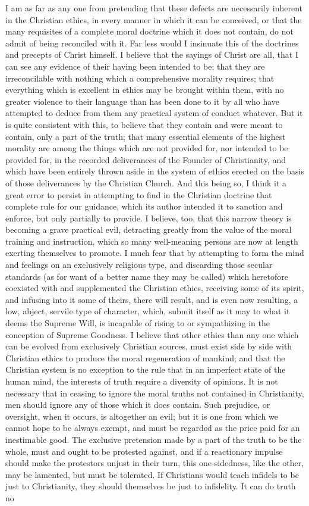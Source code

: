 \documentclass[12pt]{report}
\begin{document}
I am as far as any one from pretending that these defects are necessarily inherent in the Christian ethics, in every manner in which it can be conceived, or that the many requisites of a complete moral doctrine which it does not contain, do not admit of being reconciled with it. Far less would I insinuate this of the doctrines and precepts of Christ himself. I believe that the sayings of Christ are all, that I can see any evidence of their having been intended to be; that they are irreconcilable with nothing which a comprehensive morality requires; that everything which is excellent in ethics may be brought within them, with no greater violence to their language than has been done to it by all who have attempted to deduce from them any practical system of conduct whatever. But it is quite consistent with this, to believe that they contain and were meant to contain, only a part of the truth; that many essential elements of the highest morality are among the things which are not provided for, nor intended to be provided for, in the recorded deliverances of the Founder of Christianity, and which have been entirely thrown aside in the system of ethics erected on the basis of those deliverances by the Christian Church. And this being so, I think it a great error to persist in attempting to find in the Christian doctrine that complete rule for our guidance, which its author intended it to sanction and enforce, but only partially to provide. I believe, too, that this narrow theory is becoming a grave practical evil, detracting greatly from the value of the moral training and instruction, which so many well-meaning persons are now at length exerting themselves to promote. I much fear that by attempting to form the mind and feelings on an exclusively religious type, and discarding those secular standards (as for want of a better name they may be called) which heretofore coexisted with and supplemented the Christian ethics, receiving some of its spirit, and infusing into it some of theirs, there will result, and is even now resulting, a low, abject, servile type of character, which, submit itself as it may to what it deems the Supreme Will, is incapable of rising to or sympathizing in the conception of Supreme Goodness. I believe that other ethics than any one which can be evolved from exclusively Christian sources, must exist side by side with Christian ethics to produce the moral regeneration of mankind; and that the Christian system is no exception to the rule that in an imperfect state of the human mind, the interests of truth require a diversity of opinions. It is not necessary that in ceasing to ignore the moral truths not contained in Christianity, men should ignore any of those which it does contain. Such prejudice, or oversight, when it occurs, is altogether an evil; but it is one from which we cannot hope to be always exempt, and must be regarded as the price paid for an inestimable good. The exclusive pretension made by a part of the truth to be the whole, must and ought to be protested against, and if a reactionary impulse should make the protestors unjust in their turn, this one-sidedness, like the other, may be lamented, but must be tolerated. If Christians would teach infidels to be just to Christianity, they should themselves be just to infidelity. It can do truth no 
\end{document}
